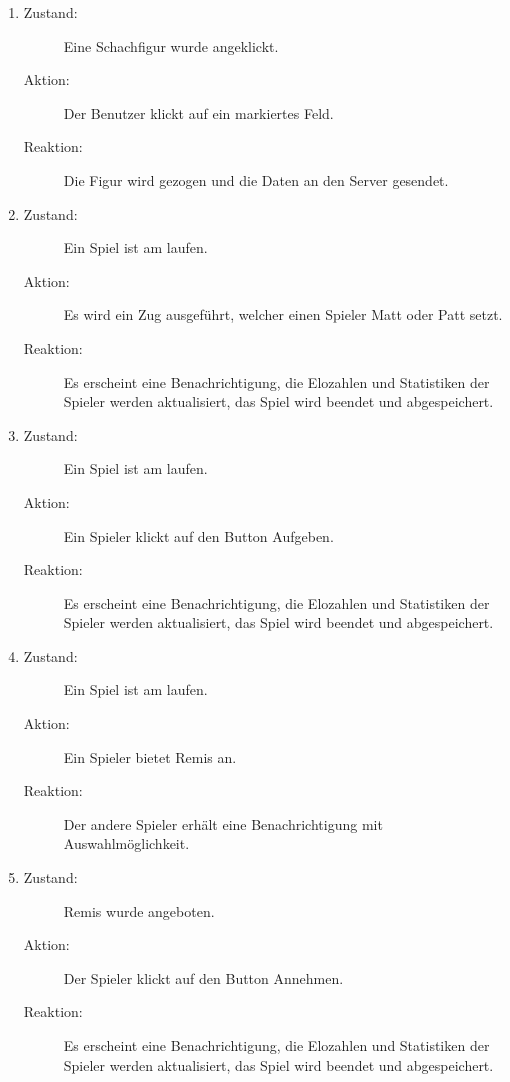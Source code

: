 \documentclass[parskip=full]{scrartcl}
\begin{document}
\begin{enumerate}
	
	\item
	\begin{description}
	\item[Zustand:] Eine \gls{Schachfigur} wurde angeklickt.
	\item[Aktion:] Der Benutzer klickt auf ein markiertes Feld.
	\item[Reaktion:] Die Figur wird gezogen und die Daten an den Server gesendet.  \\
	\end{description}
	
	\item
	\begin{description}
	\item[Zustand:] Ein Spiel ist am laufen.
	\item[Aktion:] Es wird ein Zug ausgeführt, welcher einen Spieler Matt oder Patt setzt.
	\item[Reaktion:] Es erscheint eine Benachrichtigung, die Elozahlen und Statistiken der Spieler werden aktualisiert, das Spiel wird beendet und abgespeichert.  \\
	\end{description}
	
	\item
	\begin{description}
	\item[Zustand:] Ein Spiel ist am laufen.
	\item[Aktion:] Ein Spieler klickt auf den Button \glqq Aufgeben\grqq.
	\item[Reaktion:] Es erscheint eine Benachrichtigung, die Elozahlen und Statistiken der Spieler werden aktualisiert, das Spiel wird beendet und abgespeichert.  \\
	\end{description}
	
	\item
	\begin{description}
	\item[Zustand:] Ein Spiel ist am laufen.
	\item[Aktion:] Ein Spieler bietet Remis an.
	\item[Reaktion:] Der andere Spieler erhält eine Benachrichtigung mit Auswahlmöglichkeit.  \\
	\end{description}
	
	\item
	\begin{description}
	\item[Zustand:] Remis wurde angeboten.
	\item[Aktion:] Der Spieler klickt auf den Button \glqq Annehmen\grqq.
	\item[Reaktion:] Es erscheint eine Benachrichtigung, die Elozahlen und Statistiken der Spieler werden aktualisiert, das Spiel wird beendet und abgespeichert.  \\
	\end{description}
	

\end{enumerate}
\end{document}
